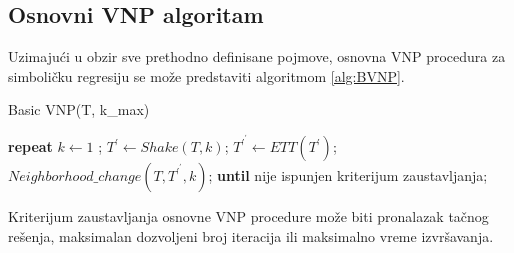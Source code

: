 \documentclass[main.tex]{subfiles}
\begin{document}
\subsection{Osnovni VNP algoritam}
\label{sec:basicVNP}

Uzimajući u obzir sve prethodno definisane pojmove, osnovna VNP procedura za simboličku regresiju se može predstaviti algoritmom \autoref{alg:BVNP}. 

\begin{algorithm}
\caption{Basic VNP(T, k_{max})}
\label{alg:BVNP}
  \begin{algorithmic}[1]
  \STATE \textbf{repeat}
    \STATE $k \leftarrow 1$ ;
        \STATE $T^{\prime} \leftarrow Shake(T, k)$;
        \STATE $T^{\prime}^{\prime} \leftarrow ETT(T^{\prime})$;
        \STATE $Neighborhood\_change(T, T^{\prime}^{\prime}, k)$;
    \ENDWHILE
    \STATE \textbf{until} nije ispunjen kriterijum zaustavljanja;
  \end{algorithmic}
\end{algorithm}

Kriterijum zaustavljanja osnovne VNP procedure može biti pronalazak tačnog rešenja, maksimalan dozvoljeni broj iteracija ili maksimalno vreme izvršavanja.
\end{document}
